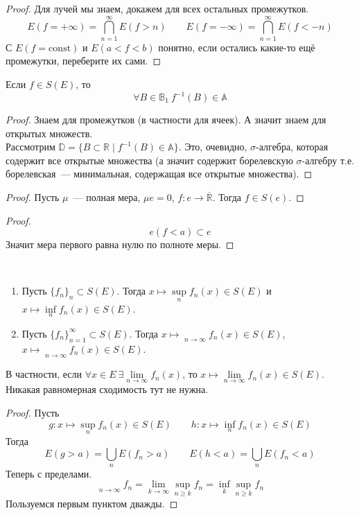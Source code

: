 \documentclass{article}
\DeclareMathOperator*{\limsup}{\overline{\lim}}
\DeclareMathOperator*{\liminf}{\underline{\lim}}
\begin{document}
    \begin{proof}
        Для лучей мы знаем, докажем для всех остальных промежутков.
        $$
        E(f=+\infty)=\bigcap\limits_{n=1}^\infty E(f>n)\qquad E(f=-\infty)=\bigcap\limits_{n=1}^\infty E(f<-n)
        $$
        С $E(f=\mathrm{const})$ и $E(a<f<b)$ понятно, если остались какие-то ещё промежутки, переберите их сами.
    \end{proof}
    \begin{property}
        Если $f\in S(E)$, то
        $$\forall B\in\mathbb B_1~f^{-1}(B)\in\mathbb A$$
    \end{property}
    \begin{proof}
        Знаем для промежутков (в частности для ячеек). А значит знаем для открытых множеств.\\
        Рассмотрим $\mathbb D=\{B\subset\mathbb R\mid f^{-1}(B)\in\mathbb A\}$. Это, очевидно, $\sigma$-алгебра, которая содержит все открытые множества (а значит содержит борелевскую $\sigma$-алгебру т.е. борелевская~--- минимальная, содержащая все открытые множества).
    \end{proof}
    \begin{proof}
        Пусть $\mu$~--- полная мера, $\mu e=0$, $f\colon e\to\overline{\mathbb R}$. Тогда $f\in S(e)$.
    \end{proof}
    \begin{proof}
        $$
        e(f<a)\subset e
        $$
        Значит мера первого равна нулю по полноте меры.
    \end{proof}
    \begin{theorem}
        \label{Измеримость граней и пределов}
        \mbox{}\\
        \begin{enumerate}
            \item Пусть $\{f_n\}_n\subset S(E)$. Тогда $x\mapsto\sup\limits_nf_n(x)\in S(E)$ и $x\mapsto\inf\limits_nf_n(x)\in S(E)$.
            \item Пусть $\{f_n\}_{n=1}^\infty\subset S(E)$. Тогда $x\mapsto\limsup\limits_{n\to\infty} f_n(x)\in S(E)$, $x\mapsto\liminf\limits_{n\to\infty} f_n(x)\in S(E)$.
        \end{enumerate}
        В частности, если $\forall x\in E~\exists\lim\limits_{n\to\infty}f_n(x)$, то $x\mapsto\lim\limits_{n\to\infty} f_n(x)\in S(E)$. Никакая равномерная сходимость тут не нужна.
    \end{theorem}
    \begin{proof}
        Пусть
        $$g\colon x\mapsto\sup\limits_nf_n(x)\in S(E)\qquad h\colon x\mapsto\inf\limits_nf_n(x)\in S(E)$$
        Тогда
        $$
        E(g>a)=\bigcup\limits_nE(f_n>a)\qquad E(h<a)=\bigcup\limits_nE(f_n<a)
        $$
        Теперь с пределами.
        $$
        \limsup\limits_{n\to\infty}f_n=\lim\limits_{k\to\infty}\sup\limits_{n\geqslant k}f_n=\inf\limits_k\sup\limits_{n\geqslant k}f_n
        $$
        Пользуемся первым пунктом дважды.
    \end{proof}
\end{document}
